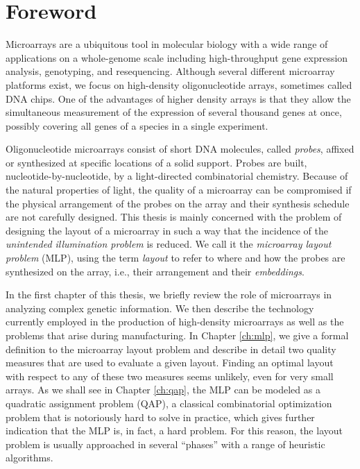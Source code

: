 \chapter*{Foreword}

Microarrays are a ubiquitous tool in molecular biology with a wide range of
applications on a whole-genome scale including high-throughput gene expression
analysis, genotyping, and resequencing. Although several different microarray
platforms exist, we focus on high-density oligonucleotide arrays, sometimes
called DNA chips. One of the advantages of higher density arrays is that they
allow the simultaneous measurement of the expression of several thousand genes
at once, possibly covering all genes of a species in a single experiment.

Oligonucleotide microarrays consist of short DNA molecules, called
\emph{probes}, affixed or synthesized at specific locations of a solid support.
Probes are built, nucleotide-by-nucleotide, by a light-directed combinatorial
chemistry. Because of the natural properties of light, the quality of a
microarray can be compromised if the physical arrangement of the probes on the
array and their synthesis schedule are not carefully designed. This thesis is
mainly concerned with the problem of designing the layout of a microarray in
such a way that the incidence of the \emph{unintended illumination problem} is
reduced. We call it the \emph{microarray layout problem} (MLP), using the term
\emph{layout} to refer to where and how the probes are synthesized on the array,
i.e., their arrangement and their \emph{embeddings}.

In the first chapter of this thesis, we briefly review the role of microarrays
in analyzing complex genetic information. We then describe the technology
currently employed in the production of high-density microarrays as well as the
problems that arise during manufacturing. In Chapter \ref{ch:mlp}, we give a
formal definition to the microarray layout problem and describe in detail two
quality measures that are used to evaluate a given layout. Finding an optimal
layout with respect to any of these two measures seems unlikely, even for very
small arrays. As we shall see in Chapter \ref{ch:qap}, the MLP can be modeled as
a quadratic assignment problem (QAP), a classical combinatorial optimization
problem that is notoriously hard to solve in practice, which gives further
indication that the MLP is, in fact, a hard problem. For this reason, the layout
problem is usually approached in several ``phases'' with a range of heuristic
algorithms.


